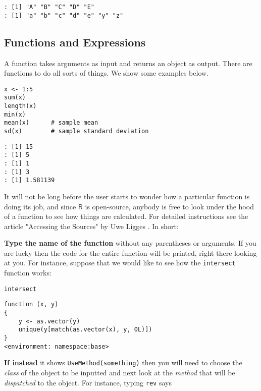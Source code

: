 \begin{verbatim}
: [1] "A" "B" "C" "D" "E"
: [1] "a" "b" "c" "d" "e" "y" "z"
\end{verbatim}

\subsection{Functions and Expressions}
\label{sec-2-3-4}

A function takes arguments as input and returns an object as
output. There are functions to do all sorts of things. We show some
examples below.

\begin{verbatim}
x <- 1:5
sum(x)
length(x)
min(x)
mean(x)      # sample mean
sd(x)        # sample standard deviation
\end{verbatim}

\begin{verbatim}
: [1] 15
: [1] 5
: [1] 1
: [1] 3
: [1] 1.581139
\end{verbatim}

It will not be long before the user starts to wonder how a particular
function is doing its job, and since \(\mathsf{R}\) is open-source,
anybody is free to look under the hood of a function to see how things
are calculated. For detailed instructions see the article "Accessing
the Sources" by Uwe Ligges \cite{Ligges2006}. In short:

\textbf{Type the name of the function} without any parentheses or
arguments. If you are lucky then the code for the entire function will
be printed, right there looking at you. For instance, suppose that we
would like to see how the \texttt{intersect}
 function works:

\begin{verbatim}
intersect
\end{verbatim}

\begin{verbatim}
function (x, y) 
{
    y <- as.vector(y)
    unique(y[match(as.vector(x), y, 0L)])
}
<environment: namespace:base>
\end{verbatim}

\textbf{If instead} it shows \texttt{UseMethod(something)}
 then you will need to choose the
\emph{class} of the object to be inputted and next look at the \emph{method}
that will be \emph{dispatched} to the object. For instance, typing \texttt{rev}
 says

